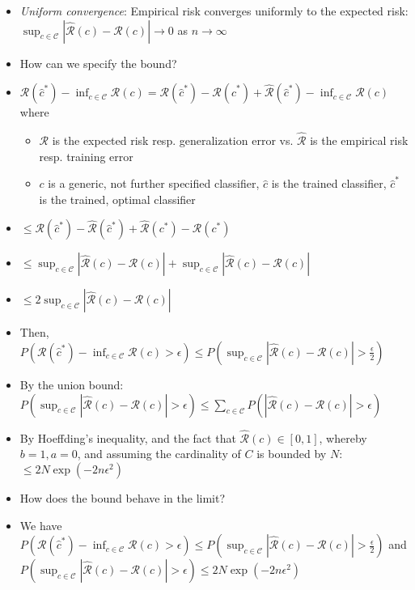 \begin{itemize}
    \item \emph{Uniform convergence}: Empirical risk converges uniformly to the expected risk: $\sup_{c \in \mathcal{C}}| \hat{\mathcal{R}}(c) - \mathcal{R}(c) | \to 0$ as $n \to \infty$
    \item How can we specify the bound?
    \item $\mathcal{R}(\hat{c}^*) - \inf_{c \in \mathcal{C}} \mathcal{R}(c) = \mathcal{R}(\hat{c}^*) - \hat{\mathcal{R}}(\hat{c}^*) + \hat{\mathcal{R}}(\hat{c}^*) - \inf_{c \in \mathcal{C}} \mathcal{R}(c)$ where
    \begin{itemize}
        \item $\mathcal{R}$ is the expected risk resp. generalization error vs. $\hat{\mathcal{R}}$ is the empirical risk resp. training error
        \item $c$ is a generic, not further specified classifier, $\hat{c}$ is the trained classifier, $\hat{c}^*$ is the trained, optimal classifier
    \end{itemize}
    \item $\leq \mathcal{R}(\hat{c}^*) - \hat{\mathcal{R}}(\hat{c}^*) + \hat{\mathcal{R}}(c^*) - \mathcal{R}(c^*)$
    \item $\leq \sup_{c \in \mathcal{C}}| \hat{\mathcal{R}}(c) - \mathcal{R}(c) | + \sup_{c \in \mathcal{C}}| \hat{\mathcal{R}}(c) - \mathcal{R}(c) |$
    \item $\leq 2\sup_{c \in \mathcal{C}}| \hat{\mathcal{R}}(c) - \mathcal{R}(c) |$
    \item Then, $P(\mathcal{R}(\hat{c}^*) - \inf_{c \in \mathcal{C}} \mathcal{R}(c) > \epsilon) \leq P(\sup_{c \in \mathcal{C}}| \hat{\mathcal{R}}(c) - \mathcal{R}(c) | > \frac{\epsilon}{2})$
    \item By the union bound: $P(\sup_{c \in \mathcal{C}}| \hat{\mathcal{R}}(c) - \mathcal{R}(c) | > \epsilon) \leq \sum_{c \in \mathcal{C}} P(| \hat{\mathcal{R}}(c) - \mathcal{R}(c) | > \epsilon)$
    \item By Hoeffding's inequality, and the fact that $\hat{\mathcal{R}}(c) \in [0,1]$, whereby $b= 1, a = 0$, and assuming the cardinality of $C$ is bounded by $N$: $\leq 2N \exp(-2n\epsilon^2)$
    \item How does the bound behave in the limit?
    \item We have $P(\mathcal{R}(\hat{c}^*) - \inf_{c \in \mathcal{C}} \mathcal{R}(c) > \epsilon) \leq P(\sup_{c \in \mathcal{C}}| \hat{\mathcal{R}}(c) - \mathcal{R}(c) | > \frac{\epsilon}{2})$ and $P(\sup_{c \in \mathcal{C}}| \hat{\mathcal{R}}(c) - \mathcal{R}(c) | > \epsilon) \leq 2N \exp(-2n\epsilon^2)$

\end{itemize}
